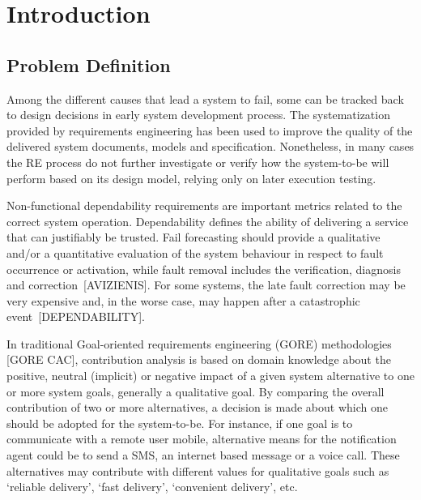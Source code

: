 \chapter{Introduction}\label{ch_introduction}%

\section{Problem Definition}

Among the different causes that lead a system to fail, some can be tracked back to design decisions in early system development process. The systematization provided by requirements engineering has been used to improve the quality of the delivered system documents, models and specification. Nonetheless, in many cases the RE process do not further investigate or verify how the system-to-be will perform based on its design model, relying only on later execution testing.


Non-functional dependability requirements are important metrics related to the correct system operation. Dependability defines the ability of delivering a service that can justifiably be trusted. Fail forecasting should provide a qualitative and/or a quantitative evaluation of the system behaviour in respect to fault occurrence or activation, while fault removal includes the verification, diagnosis and correction~[AVIZIENIS]. For some systems, the late fault correction may be very expensive and, in the worse case, may happen after a catastrophic event~[DEPENDABILITY].

In traditional Goal-oriented requirements engineering (GORE) methodologies [GORE CAC], contribution  analysis is based on domain knowledge about the positive, neutral (implicit) or negative impact of a given system alternative to one or more system goals, generally a qualitative goal. By  comparing the overall contribution of two or more alternatives, a decision is made about which one should be adopted for the system-to-be. For instance, if one goal is to communicate with a remote user mobile, alternative means for the notification agent could be to send a SMS, an internet based message or a voice call. These alternatives may contribute with different values for qualitative goals such as `reliable delivery', `fast delivery', `convenient delivery', etc. 

